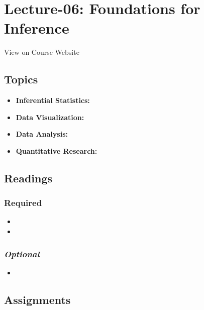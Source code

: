 \documentclass[]{book}
\providecommand{\tightlist}{%
  \setlength{\itemsep}{0pt}\setlength{\parskip}{0pt}}
\theoremstyle{definition}
\theoremstyle{definition}
\theoremstyle{definition}
\theoremstyle{remark}
\begin{document}
\section{Lecture-06: Foundations for
Inference}\label{lecture-06-foundations-for-inference}

View on Course Website

\subsection*{Topics}\label{topics-6}

\begin{itemize}
\tightlist
\item
  \textbf{Inferential Statistics:}
\item
  \textbf{Data Visualization:}
\item
  \textbf{Data Analysis:}
\item
  \textbf{Quantitative Research:}
\end{itemize}

\subsection*{Readings}\label{readings-7}

\subsubsection*{Required}\label{required-6}

\begin{itemize}
\item
\item
\end{itemize}

\subsubsection*{\texorpdfstring{\emph{Optional}}{Optional}}\label{optional-6}

\begin{itemize}
\item
\end{itemize}

\subsection*{Assignments}\label{assignments-7}
\end{document}
